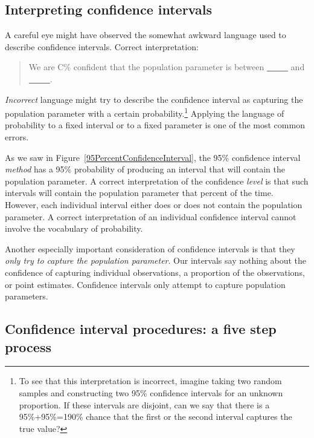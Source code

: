 \subsection{Interpreting confidence intervals}
\label{interpretingCIs}


A careful eye might have observed the somewhat awkward language used to describe confidence intervals. Correct interpretation:
\begin{quote}
We are C\% confident that the population parameter is between \underline{\ \ \ \ \ } and \underline{\ \ \ \ \ }.
\end{quote}
\emph{Incorrect} language might try to describe the confidence interval as capturing the population parameter with a certain probability.\footnote{To see that this interpretation is incorrect, imagine taking two random samples and constructing two 95\% confidence intervals for an unknown proportion. If these intervals are disjoint, can we say that there is a 95\%+95\%=190\% chance that the first or the second interval captures the true value?} Applying the language of probability to a fixed interval or to a fixed parameter is one of the most common errors.  

As we saw in Figure~\ref{95PercentConfidenceInterval}, the 95\% confidence interval \emph{method} has a 95\% probability of producing an interval that will contain the population parameter. A correct interpretation of the confidence \emph{level} is that such intervals will contain the population parameter that percent of the time. However, each individual interval either does or does not contain the population parameter. A correct interpretation of an individual confidence interval cannot involve the vocabulary of probability.

Another especially important consideration of confidence intervals is that they \emph{only try to capture the population parameter}. Our intervals say nothing about the confidence of capturing individual observations, a proportion of the observations, or point estimates. Confidence intervals only attempt to capture population parameters.



\subsection{Confidence interval procedures: a five step process}

